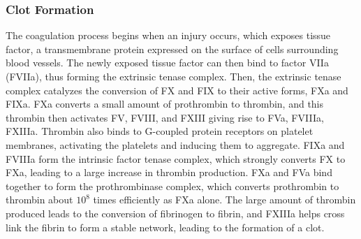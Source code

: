 \documentclass[12pt]{article}
\begin{document}
\subsubsection*{Clot Formation}
The coagulation process begins when an injury occurs, which exposes tissue factor, a transmembrane protein expressed on the surface of cells surrounding blood vessels. \citep{mackman2009role} The newly exposed tissue factor can then bind to factor VIIa (FVIIa), thus forming the extrinsic tenase complex. Then, the extrinsic tenase complex catalyzes the conversion of FX and FIX to their active forms, FXa and FIXa. \cite{mann2006models} FXa converts a small amount of prothrombin to thrombin, and this thrombin then activates FV, FVIII, and FXIII giving rise to FVa, FVIIIa, FXIIIa.\cite{orfeo2004factor} Thrombin also binds to G-coupled protein receptors on platelet membranes, activating the platelets and inducing them to aggregate.\citep{hoffman2009hematology} FIXa and FVIIIa form the intrinsic factor tenase complex, which strongly converts FX to FXa, leading to a large increase in thrombin production. FXa and FVa bind together to form the prothrombinase complex, which converts prothrombin to thrombin about $10^8$ times efficiently as FXa alone. \cite{walker1994activation} The large amount of thrombin produced leads to the conversion of fibrinogen to fibrin, and FXIIIa helps cross link the fibrin to form a stable network, leading to the formation of a clot. \cite{hoffman2009hematology}
\end{document}
